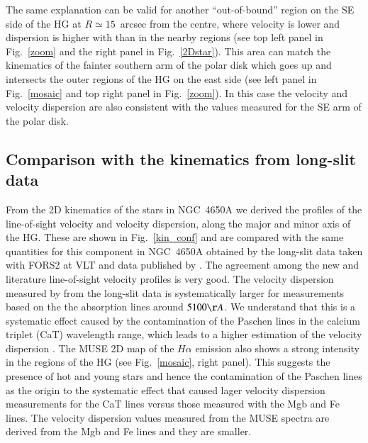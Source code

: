 \documentclass{aa}
\begin{document}
The same explanation can be valid for another ``out-of-bound'' region
on the SE side of the HG at $R\simeq 15$~arcsec from the centre, where
velocity is lower and dispersion is higher with than in the
nearby regions (see top left panel in Fig.~\ref{zoom} and the
right panel in Fig.~\ref{2Dstar}). This area can match the kinematics
of the fainter southern arm of the polar disk which goes up and
intersects the outer regions of the HG on the east side (see left panel in 
Fig.~\ref{mosaic} and top right panel in Fig.~\ref{zoom}). In this case the velocity and velocity
dispersion are also consistent with the values measured for the SE arm of the polar disk. 


\subsection{Comparison with the kinematics from long-slit data}

From the 2D kinematics of the stars in NGC~4650A we derived the
profiles of the  line-of-sight velocity and velocity dispersion,
along the major and minor axis of the HG. These are shown in
Fig.~\ref{kin_conf} and are compared with the same quantities for this
component in NGC~4650A obtained by the long-slit data taken with FORS2
at VLT \citep{Iod06} and data published by \citet{Sackett94}. The
agreement among the new and literature line-of-sight velocity
profiles is very good. The velocity dispersion measured by
\citet{Iod06} from the long-slit data is systematically larger for
measurements based on the the absorption lines around $5100 \AA$.  We
understand that this is a systematic effect caused by the
contamination of the Paschen lines in the calcium triplet (CaT)
wavelength range, which leads to a higher estimation of the velocity
dispersion \citep{Iod06}. The MUSE 2D map of the
$H\alpha$ emission also shows a strong intensity  in the regions of the
HG (see Fig.~\ref{mosaic}, right panel). This suggests the presence of
hot and young stars and hence the contamination of the Paschen lines
as the origin to the systematic effect that caused lager velocity
dispersion measurements for the CaT lines versus those measured with the 
  Mgb and Fe lines. The velocity dispersion values measured from the MUSE
spectra are derived from the Mgb and Fe lines and they are smaller.
\end{document}
